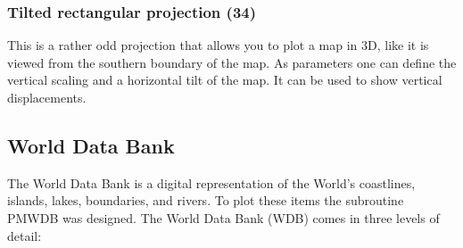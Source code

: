 \documentclass[titlepage,a4paper]{article}
\begin{document}
\subsubsection*{Tilted rectangular projection (34)}
This is a rather odd projection that allows you to plot a map in 3D, like
it is viewed from the southern boundary of the map. As parameters one can
define the vertical scaling and a horizontal tilt of the map. It can be
used to show vertical displacements.

\subsection{World Data Bank}
\label{WDB}
The World Data Bank is a digital representation of the World's coastlines,
islands, lakes, boundaries, and rivers. To plot these items the subroutine
PMWDB was designed. The World Data Bank (WDB) comes in
three levels of detail:
\end{document}
